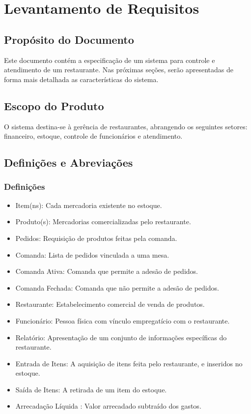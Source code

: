\section{Levantamento de Requisitos}\label{requisitos}

\subsection{Propósito do Documento}
Este documento contém a especificação de um sistema para controle e atendimento de um restaurante. Nas próximas seções, serão apresentadas de forma mais detalhada as características do sistema.



\subsection{Escopo do Produto}
O sistema destina-se à gerência de restaurantes, abrangendo os seguintes setores: financeiro, estoque, controle de funcionários e atendimento.



\subsection{Definições e Abreviações}
	\subsubsection{Definições}
	\begin{itemize}
	\item[] Item(ns): Cada mercadoria existente no estoque.
	\item[] Produto(s): Mercadorias comercializadas pelo restaurante.
	\item[] Pedidos: Requisição de produtos feitas pela comanda.
	\item[] Comanda: Lista de pedidos vinculada a uma mesa.
	\item[] Comanda Ativa: Comanda que permite a adesão de pedidos.
	\item[] Comanda Fechada: Comanda que não permite a adesão de pedidos.
	\item[] Restaurante: Estabelecimento comercial de venda de produtos.
	\item[] Funcionário: Pessoa física com vínculo empregatício com o restaurante.
	\item[] Relatório: Apresentação de um conjunto de informações específicas do restaurante.
	\item[] Entrada de Itens: A aquisição de itens feita pelo restaurante, e inseridos no estoque.
	\item[] Saída de Itens: A retirada de um item do estoque.
	\item[] Arrecadação Líquida : Valor arrecadado subtraído dos gastos.
	\end{itemize}

